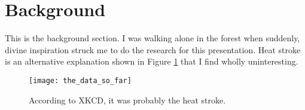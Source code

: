\section{Background}

This is the background section. I was walking alone in the forest when suddenly, divine
inspiration struck me to do the research for this presentation. Heat stroke is an alternative explanation shown in Figure \ref{fig:bar-chart} that I find wholly uninteresting.
\begin{figure}[h]
  \centering
  \texttt{[image: the\_data\_so\_far]}
  \caption{According to XKCD, it was probably the heat stroke.}
  \label{fig:bar-chart}
\end{figure}
